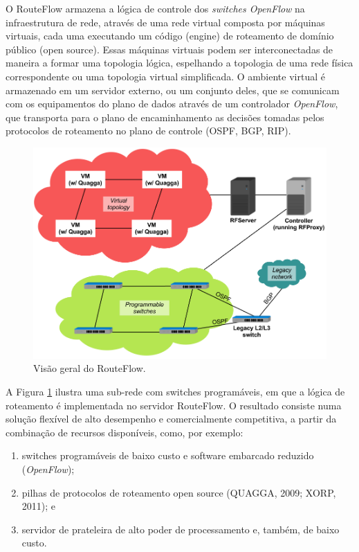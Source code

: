 O RouteFlow armazena a lógica de
controle dos \textit{switches OpenFlow} na infraestrutura de rede,
através de uma rede virtual composta por máquinas virtuais, cada uma executando um código
(engine) de roteamento de domínio público (open source).
Essas máquinas virtuais podem ser interconectadas
de maneira a formar uma topologia lógica, espelhando a
topologia de uma rede física correspondente ou uma topologia
virtual simplificada. O ambiente virtual é armazenado em um
servidor externo, ou um conjunto deles, que se comunicam com
os equipamentos do plano de dados através de um controlador
\textit{OpenFlow}, que transporta para o plano de encaminhamento as
decisões tomadas pelos protocolos de roteamento no plano de
controle (OSPF, BGP, RIP). 

\begin{figure}[h]
\centering
\includegraphics[width=160mm]{visaoGeralRouteFlow.png}
\caption{Visão geral do RouteFlow.}
\label{fig:visaoGeralRouteFlow} 
\end{figure}

A Figura \ref{fig:visaoGeralRouteFlow} ilustra uma sub-rede com
switches programáveis, em que a lógica de roteamento é
implementada no servidor RouteFlow. O resultado consiste
numa solução flexível de alto desempenho e comercialmente
competitiva, a partir da combinação de recursos disponíveis,
como, por exemplo:

\begin{enumerate}[{a)}] 
\item switches programáveis de baixo
custo e software embarcado reduzido (\textit{OpenFlow}); 
\item pilhas de protocolos de roteamento open source (QUAGGA, 2009; XORP,
2011); e 
\item servidor de prateleira de alto poder de
processamento e, também, de baixo custo. 
\end{enumerate}


